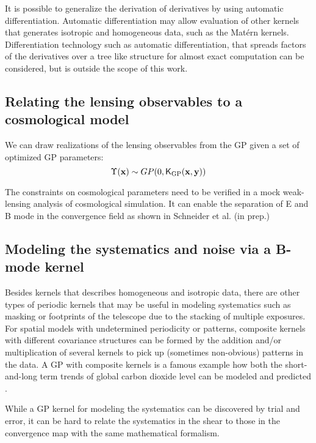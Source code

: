 It is possible to generalize the derivation of derivatives by using automatic
differentiation. Automatic differentiation may allow evaluation of other
kernels that generates isotropic and homogeneous data, 
such as the Mat\'{e}rn kernels.  
Differentiation technology such as automatic differentiation, 
that spreads factors of the derivatives over a tree like structure for
almost exact computation can be considered, but is outside the scope of this work.




\subsection{Relating the lensing observables to a cosmological model}
We can draw realizations of the lensing observables from the GP given a set of
optimized GP parameters:
\begin{equation}
	\Upsilon(\mathbf{x}) \sim GP(0, \mathsf{K}_{\rm GP}(\mathbf{x}, \mathbf{y})) 
\end{equation}


The constraints on cosmological parameters need to be verified in a mock
weak-lensing analysis of cosmological simulation. 
It can enable the separation of E and B mode in the convergence field as shown
in Schneider et al. (in prep.) 

\subsection{Modeling the systematics and noise via a B-mode kernel}
Besides kernels that describes homogeneous and isotropic data,
there are other types of periodic kernels that may be useful
in modeling systematics such as masking or footprints of the telescope due to the
stacking of multiple exposures.
For spatial models with undetermined periodicity or patterns, 
composite kernels with different covariance structures 
can be formed by the addition and/or multiplication of several kernels
 to pick up (sometimes non-obvious) patterns in the data. 
A GP with composite kernels is a
famous example how both the short-and-long term trends of global carbon
dioxide level can be modeled and predicted \citep{Duvenaud2013}.

While a GP kernel for modeling the systematics 
can be discovered by trial and error, 
it can be hard to relate the systematics in the shear to those in the
convergence map with the same mathematical formalism. 


